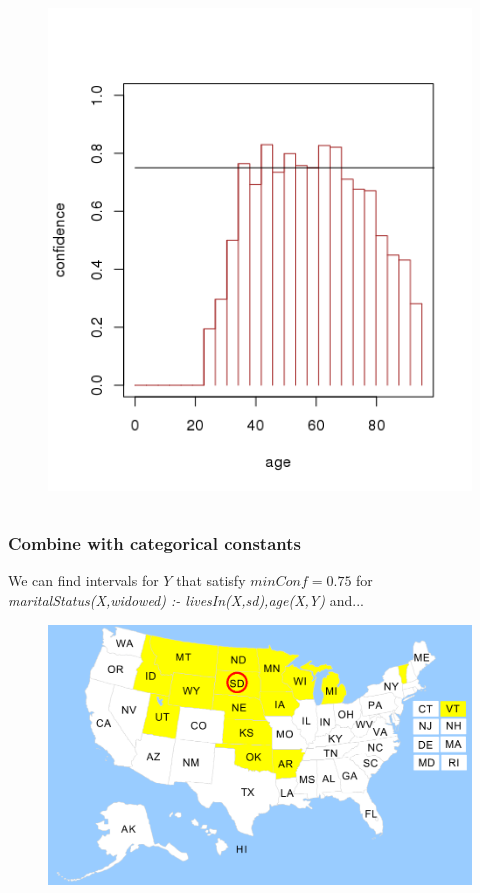 \documentclass{beamer}
\begin{document}
\begin{frame}
\begin{columns}[c]
\begin{figure}
      \includegraphics[width=1\linewidth]{./Figures/age-married-southdakota-minConf.png}
      \end{figure}
  \end{columns}
\end{frame}
\begin{frame}
\frametitle{Combine with categorical constants}      
  We can find intervals for $Y$ that satisfy $minConf=0.75$ for \emph{maritalStatus(X,widowed) :-
livesIn(X,sd),age(X,Y)} and...
  \begin{figure}
  \includegraphics[width=0.8\linewidth]{./Figures/usmap.png}
  \end{figure}

\end{frame}
\end{document}
